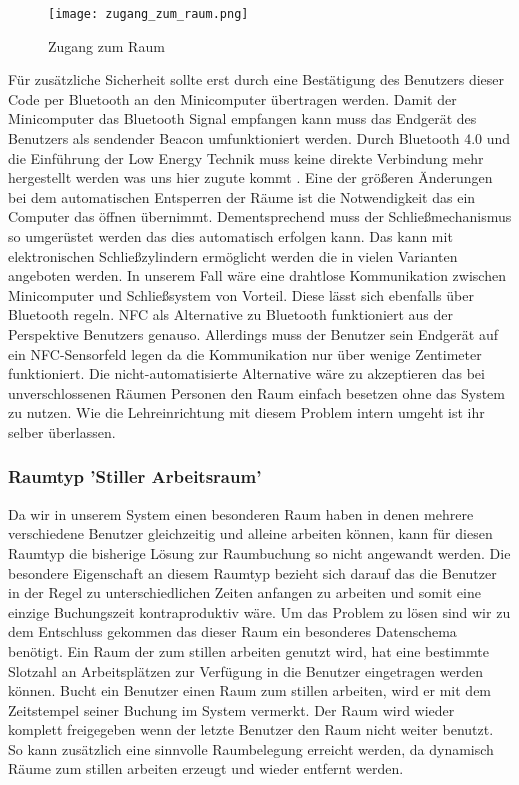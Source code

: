 \begin{figure}
	\centering
	\texttt{[image: zugang\_zum\_raum.png]}
	\caption{Zugang zum Raum}
\end{figure}

Für zusätzliche Sicherheit sollte erst durch eine Bestätigung des Benutzers
dieser Code per Bluetooth an den Minicomputer übertragen werden. Damit der
Minicomputer das Bluetooth Signal empfangen kann muss das Endgerät des
Benutzers als sendender Beacon umfunktioniert werden. Durch Bluetooth 4.0 und
die Einführung der Low Energy Technik muss keine direkte Verbindung mehr
hergestellt werden was uns hier zugute kommt \cite{[Quelle](https://californiaconsultants.org/wp-content/uploads/2014/05/CNSV-1205-Decuir.pdf)}.
Eine der größeren Änderungen bei dem automatischen Entsperren der Räume ist die
Notwendigkeit das ein Computer das öffnen übernimmt. Dementsprechend muss der
Schließmechanismus so umgerüstet werden das dies automatisch erfolgen kann.
Das kann mit elektronischen Schließzylindern ermöglicht werden die in vielen
Varianten angeboten werden. In unserem Fall wäre eine drahtlose Kommunikation
zwischen Minicomputer und Schließsystem von Vorteil. Diese lässt sich ebenfalls
über Bluetooth regeln. 
NFC als Alternative zu Bluetooth funktioniert aus der Perspektive Benutzers
genauso. Allerdings muss der Benutzer sein Endgerät auf ein NFC-Sensorfeld
legen da die Kommunikation nur über wenige Zentimeter funktioniert.
Die nicht-automatisierte Alternative wäre zu akzeptieren das bei
unverschlossenen Räumen Personen den Raum einfach besetzen ohne das System zu
nutzen. Wie die Lehreinrichtung mit diesem Problem intern umgeht ist ihr selber
überlassen.

\subsubsection{Raumtyp 'Stiller Arbeitsraum'}
\label{sec:Raumtyp_Stiller_Arbeitsraum}

Da wir in unserem System einen besonderen Raum haben in denen mehrere
verschiedene Benutzer gleichzeitig und alleine arbeiten können, kann für diesen
Raumtyp die bisherige Lösung zur Raumbuchung so nicht angewandt werden.
Die besondere Eigenschaft an diesem Raumtyp bezieht sich darauf das die
Benutzer in der Regel zu unterschiedlichen Zeiten anfangen zu arbeiten und
somit eine einzige Buchungszeit kontraproduktiv wäre. Um das Problem zu lösen
sind wir zu dem Entschluss gekommen das dieser Raum ein besonderes Datenschema
benötigt. Ein Raum der zum stillen arbeiten genutzt wird, hat eine bestimmte
Slotzahl an Arbeitsplätzen zur Verfügung in die Benutzer eingetragen werden
können. Bucht ein Benutzer einen Raum zum stillen arbeiten, wird er mit dem
Zeitstempel seiner Buchung im System vermerkt. Der Raum wird wieder komplett
freigegeben wenn der letzte Benutzer den Raum nicht weiter benutzt. So kann
zusätzlich eine sinnvolle Raumbelegung erreicht werden, da dynamisch Räume zum
stillen arbeiten erzeugt und wieder entfernt werden.

